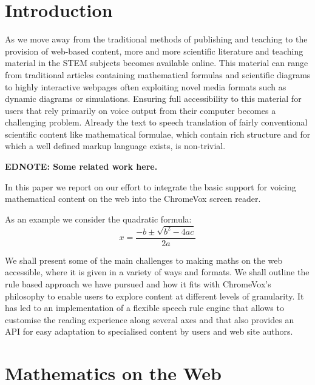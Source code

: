 \documentclass{sig-alternate}
\newcommand\ednote[1]{\typeout{There is still a note!!!}%
  {\bf EDNOTE: #1}}
\begin{document}


\section{Introduction}\label{sec:intro} As we move away from the traditional
methods of publishing and teaching to the provision of web-based content, more
and more scientific literature and teaching material in the STEM subjects
becomes available online. This material can range from traditional articles
containing mathematical formulas and scientific diagrams to highly interactive
webpages often exploiting novel media formats such as dynamic diagrams or
simulations. Ensuring full accessibility to this material for users that rely
primarily on voice output from their computer becomes a challenging
problem. Already the text to speech translation of fairly conventional
scientific content like mathematical formulae, which contain rich structure and
for which a well defined markup language exists, is non-trivial.


\ednote{Some related work here.}

In this paper we report on our effort to integrate the basic support
for voicing mathematical content on the web into the ChromeVox screen
reader. 





As an example we consider the quadratic formula:
\begin{equation}
  \label{eq:quadratic}
  x=\frac{-b \pm \sqrt {b^2-4ac}}{2a}
\end{equation}


We shall present some of the main challenges to making maths
on the web accessible, where it is given in a variety of ways and
formats. We shall outline the rule based approach we have pursued and
how it fits with ChromeVox's philosophy to enable users to explore
content at different levels of granularity. It has led to an
implementation of a flexible speech rule engine that allows to
customise the reading experience along several axes and that also
provides an API for easy adaptation to specialised content by users
and web site authors.

\section{Mathematics on the Web}
\label{sec:math}
\end{document}
